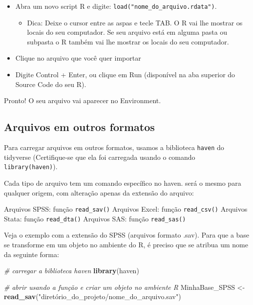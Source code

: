 \documentclass[
  brazil,
]{book}
\newenvironment{Shaded}{\begin{snugshade}}{\end{snugshade}}
\newcommand{\CommentTok}[1]{\textcolor[rgb]{0.56,0.35,0.01}{\textit{#1}}}
\newcommand{\KeywordTok}[1]{\textcolor[rgb]{0.13,0.29,0.53}{\textbf{#1}}}
\newcommand{\NormalTok}[1]{#1}
\newcommand{\StringTok}[1]{\textcolor[rgb]{0.31,0.60,0.02}{#1}}
\providecommand{\tightlist}{%
  \setlength{\itemsep}{0pt}\setlength{\parskip}{0pt}}
\begin{document}
\begin{itemize}
\tightlist
\item
  Abra um novo script R e digite: \texttt{load("nome\_do\_arquivo.rdata")}.

  \begin{itemize}
  \tightlist
  \item
    Dica: Deixe o cursor entre as aspas e tecle TAB. O R vai lhe mostrar os locais do seu computador. Se seu arquivo está em alguma pasta ou subpasta o R também vai lhe mostrar os locais do seu computador.
  \end{itemize}
\item
  Clique no arquivo que você quer importar
\item
  Digite Control + Enter, ou clique em Run (disponível na aba superior do Source Code do seu R).
\end{itemize}

Pronto! O seu arquivo vai aparecer no Environment.

\hypertarget{arquivos-em-outros-formatos-1}{%
\subsection{Arquivos em outros formatos}\label{arquivos-em-outros-formatos-1}}

Para carregar arquivos em outros formatos, usamos a biblioteca \texttt{haven} do tidyverse (Certifique-se que ela foi carregada usando o comando \texttt{library(haven)}).

Cada tipo de arquivo tem um comando específico no haven. será o mesmo para qualquer origem, com alteração apenas da extensão do arquivo:

Arquivos SPSS: função \texttt{read\_sav()}
Arquivos Excel: função \texttt{read\_csv()}
Arquivos Stata: função \texttt{read\_dta()}
Arquivos SAS: função \texttt{read\_sas()}

Veja o exemplo com a extensão do SPSS (arquivos formato .sav). Para que a base se transforme em um objeto no ambiente do R, é preciso que se atribua um nome da seguinte forma:

\begin{Shaded}
\begin{Highlighting}[]
\CommentTok{# carregar a biblioteca haven}
\KeywordTok{library}\NormalTok{(haven)}

\CommentTok{# abrir usando a função e criar um objeto no ambiente R}
\NormalTok{MinhaBase_SPSS <-}\StringTok{ }\KeywordTok{read_sav}\NormalTok{(}\StringTok{"diretório_do_projeto/nome_do_arquivo.sav"}\NormalTok{)}
\end{Highlighting}
\end{Shaded}
\end{document}
